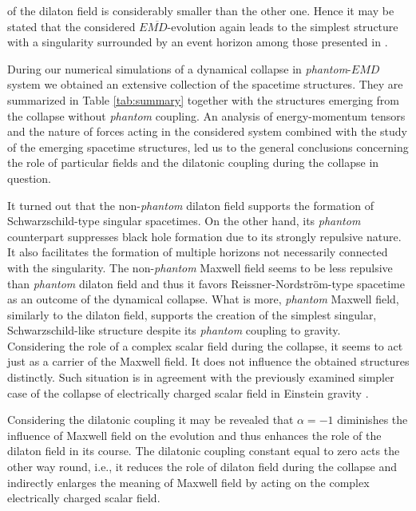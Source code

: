 \documentclass[aps,showpacs,nofootinbib,floatfix]{revtex4}
\begin{document}
of the dilaton field is considerably smaller than the other one. Hence it may be stated that 
the considered $E\overline{MD}$-evolution 
again leads to the simplest structure with a singularity surrounded by an event horizon among those 
presented in \cite{cle09}.
\par
During our numerical simulations of a dynamical collapse in {\it phantom}-$EMD$ system we obtained an 
extensive collection of the spacetime structures. They are summarized in Table \ref{tab:summary} 
together with the structures emerging from the collapse without {\it phantom} coupling. An analysis 
of energy-momentum tensors and the nature of forces acting in the considered system 
combined with the study of the emerging spacetime structures, led us to the general conclusions concerning 
the role of particular fields and the dilatonic coupling during the collapse in question.
\par
It turned out that the non-{\it phantom} dilaton field supports the formation of 
Schwarzschild-type singular spacetimes. On the other hand, its {\it phantom} 
counterpart suppresses black hole formation due to its strongly repulsive nature. 
It also facilitates the formation of multiple horizons not necessarily connected with the singularity.
The non-{\it phantom} Maxwell field seems to be less repulsive than {\it phantom} dilaton field 
and thus it favors Reissner-Nordstr\"{o}m-type spacetime as an outcome of the
dynamical collapse. What is more, {\it phantom} Maxwell field, similarly to the dilaton field, supports the 
creation of the simplest singular, Schwarzschild-like structure despite its {\it phantom} coupling to gravity.\\ 
Considering the role of a complex scalar field during the collapse, it seems to act just as a carrier of the 
Maxwell field. It does not influence the obtained structures distinctly. Such situation is in agreement with 
the previously examined simpler case of the collapse of electrically charged scalar field in Einstein 
gravity \cite{ore03}.
\par
Considering the dilatonic coupling it may be revealed that $\alpha=-1$ diminishes the influence of Maxwell field 
on the evolution and thus enhances the role of the dilaton field in its course. The dilatonic coupling 
constant equal to zero acts the other way round, i.e., it reduces the role of dilaton field during the 
collapse and indirectly enlarges the meaning of Maxwell field by acting on the complex electrically charged scalar field.
\end{document}
